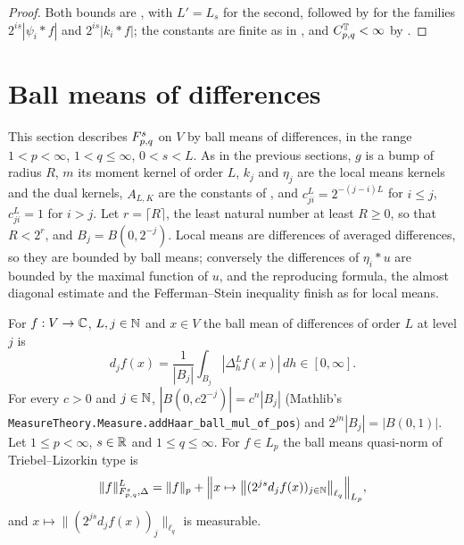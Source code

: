 \begin{proof}
\leanok
Both bounds are , with $L' = L_s$ for the second, followed by
 for the families $2^{is} |\psi_i * f|$ and
$2^{is} |k_i * f|$; the constants are finite as in , and
$C^{\mathbb{T}}_{p,q} < \infty$ by .
\end{proof}

\section{Ball means of differences}
\label{sec:tl-ball-means}

This section describes $F^{s}_{p,q}$ on $V$ by ball means of differences, in the range
$1 < p < \infty$, $1 < q \leq \infty$, $0 < s < L$. As in the previous sections, $g$ is a bump of
radius $R$, $m$ its moment kernel of order $L$, $k_j$ and $\eta_j$ are the local means kernels and
the dual kernels, $A_{L,K}$ are the constants of , and
$c^L_{ji} = 2^{-(j-i)L}$ for $i \leq j$, $c^L_{ji} = 1$ for $i > j$. Let $r = \lceil R \rceil$,
the least natural number at least $R \geq 0$, so that $R < 2^r$, and $B_j = B(0, 2^{-j})$. Local
means are differences of averaged differences, so they are bounded by ball means; conversely the
differences of $\eta_i * u$ are bounded by the maximal function of $u$, and the reproducing
formula, the almost diagonal estimate and the Fefferman--Stein inequality finish as for local
means.

\begin{definition}
\label{def:ball-means-differences}
\leanok
{}
For $f : V \to \mathbb{C}$, $L, j \in \mathbb{N}$ and $x \in V$ the ball mean of differences of order $L$ at
level $j$ is
\[
  d_j f(x) = \frac{1}{|B_j|} \int_{B_j} |\Delta^L_h f(x)| \, dh \in [0, \infty] .
\]
For every $c > 0$ and $j \in \mathbb{N}$, $|B(0, c 2^{-j})| = c^n |B_j|$ (Mathlib's
\texttt{MeasureTheory.Measure.addHaar\_ball\_mul\_of\_pos}) and $2^{jn} |B_j| = |B(0,1)|$.
Let $1 \leq p < \infty$, $s \in \mathbb{R}$ and $1 \leq q \leq \infty$. For $f \in L_p$ the ball means
quasi-norm of Triebel--Lizorkin type is
\[
  \|f\|^{L}_{F^s_{p,q}, \Delta} = \|f\|_p + \Bigl\| x \mapsto \bigl\| (2^{js} d_j f(x))_{j \in \mathbb{N}}
  \bigr\|_{\ell_q} \Bigr\|_{L_p},
\]
and $x \mapsto \|(2^{js} d_j f(x))_j\|_{\ell_q}$ is measurable.
\end{definition}

